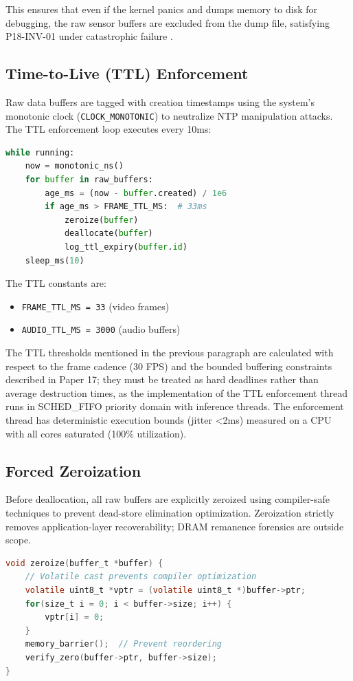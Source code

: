 \documentclass[conference]{IEEEtran}
\begin{document}
This ensures that even if the kernel panics and dumps memory to disk for debugging, the raw sensor buffers are excluded from the dump file, satisfying P18-INV-01 under catastrophic failure \cite{b21}.

\subsection{Time-to-Live (TTL) Enforcement}
Raw data buffers are tagged with creation timestamps using the system's monotonic clock (\texttt{CLOCK\_MONOTONIC}) to neutralize NTP manipulation attacks. The TTL enforcement loop executes every 10ms:

\begin{lstlisting}[language=Python, caption={TTL Enforcement Loop}]
while running:
    now = monotonic_ns()
    for buffer in raw_buffers:
        age_ms = (now - buffer.created) / 1e6
        if age_ms > FRAME_TTL_MS:  # 33ms
            zeroize(buffer)
            deallocate(buffer)
            log_ttl_expiry(buffer.id)
    sleep_ms(10)
\end{lstlisting}

The TTL constants are:
\begin{itemize}
    \item \texttt{FRAME\_TTL\_MS = 33} (video frames)
    \item \texttt{AUDIO\_TTL\_MS = 3000} (audio buffers)
\end{itemize}

The TTL thresholds mentioned in the previous paragraph are calculated with respect to the frame cadence (30 FPS) and the bounded buffering constraints described in Paper 17; they must be treated as hard deadlines rather than average destruction times, as the implementation of the TTL enforcement thread runs in SCHED\_FIFO priority domain with inference threads. The enforcement thread has deterministic execution bounds (jitter <2ms) measured on a CPU with all cores saturated (100\% utilization).

\subsection{Forced Zeroization}
Before deallocation, all raw buffers are explicitly zeroized using compiler-safe techniques to prevent dead-store elimination optimization. Zeroization strictly removes application-layer recoverability; DRAM remanence forensics are outside scope.

\begin{lstlisting}[language=C, caption={Zeroization Procedure}]
void zeroize(buffer_t *buffer) {
    // Volatile cast prevents compiler optimization
    volatile uint8_t *vptr = (volatile uint8_t *)buffer->ptr;
    for(size_t i = 0; i < buffer->size; i++) {
        vptr[i] = 0;
    }
    memory_barrier();  // Prevent reordering
    verify_zero(buffer->ptr, buffer->size);
}
\end{lstlisting}
\end{document}
